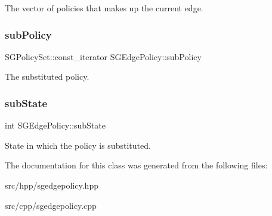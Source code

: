 The vector of policies that makes up the current edge. \mbox{\label{classSGEdgePolicy_a2b008e2ce91f6c95130af3efc5915e7f}} 
\subsubsection{\texorpdfstring{sub\+Policy}{subPolicy}}
{\footnotesize\ttfamily S\+G\+Policy\+Set\+::const\+\_\+iterator S\+G\+Edge\+Policy\+::sub\+Policy\hspace{0.3cm}{\ttfamily [private]}}

The substituted policy. \mbox{\label{classSGEdgePolicy_af12e8542627470a6c50abc6925512737}} 
\subsubsection{\texorpdfstring{sub\+State}{subState}}
{\footnotesize\ttfamily int S\+G\+Edge\+Policy\+::sub\+State\hspace{0.3cm}{\ttfamily [private]}}

State in which the policy is substituted. 

The documentation for this class was generated from the following files\+:\begin{DoxyCompactItemize}
\item 
src/hpp/sgedgepolicy.\+hpp\item 
src/cpp/sgedgepolicy.\+cpp\end{DoxyCompactItemize}
